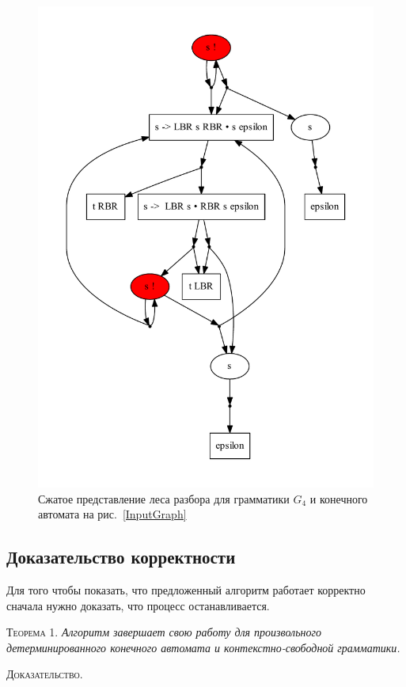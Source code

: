\documentclass[14pt]{matmex-diploma}
\begin{document}
\begin{figure}
 \centering
 \includegraphics[width=13cm]{pics/SppfExample.pdf}
 \caption{Сжатое представление леса разбора для грамматики $G_4$ и конечного автомата на рис.~\ref{InputGraph} }
 \label{ExSppf}
\end{figure}

\subsection{Доказательство корректности}
Для того чтобы показать, что предложенный алгоритм работает корректно сначала нужно доказать, что процесс останавливается.

\textsc{Теорема 1.} 
\textit{Алгоритм завершает свою работу для произвольного детерминированного конечного автомата и контекстно-свободной грамматики.}

\textsc{Доказательство.}
\end{document}
